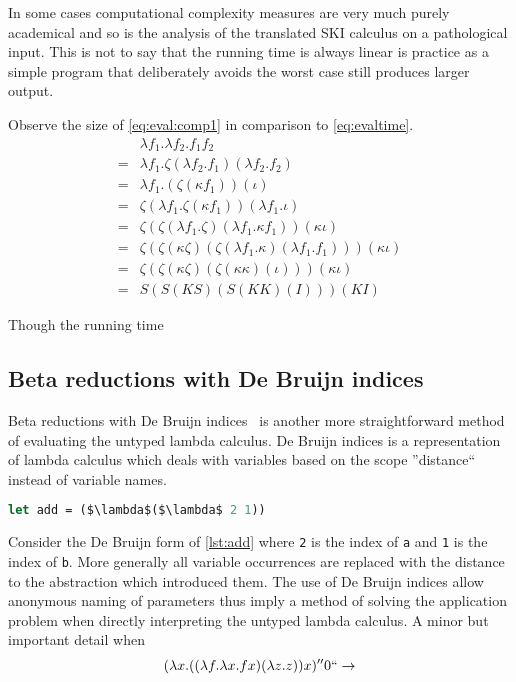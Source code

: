 \documentclass[11pt,oneside,a4paper]{report}
\begin{document}
In some cases computational complexity measures are very much purely academical and so is the analysis of the translated SKI calculus on a pathological input.
This is not to say that the running time is always linear is practice as a simple program that deliberately avoids the worst case still produces larger output.
\begin{exmp}
    Observe the size of \autoref{eq:eval:comp1} in comparison to \autoref{eq:evaltime}.
\begin{align}
    &\lambda f_1 . \lambda f_2 . f_1 f_2 \label{eq:eval:comp1}\\
    =&\lambda f_1 . \zeta(\lambda f_2 . f_1)(\lambda f_2 . f_2) \tag*{} \\
    =&\lambda f_1 . (\zeta(\kappa f_1))(\iota) \tag*{} \\
    =&\zeta (\lambda f_1 . \zeta (\kappa f_1)) (\lambda f_1 . \iota) \tag*{} \\
    =&\zeta (\zeta (\lambda f_1 . \zeta) (\lambda f_1 . \kappa f_1)) (\kappa \iota) \tag*{} \\
    =&\zeta (\zeta (\kappa \zeta) (\zeta (\lambda f_1 . \kappa) (\lambda f_1 . f_1))) (\kappa \iota) \tag*{} \\
    =&\zeta (\zeta (\kappa \zeta) (\zeta (\kappa \kappa) (\iota))) (\kappa \iota) \tag*{} \\
    =&S (S (K S) (S (K K) (I))) (K I) \tag*{}
\end{align}
\end{exmp}

Though the running time 

\subsection{Beta reductions with De Bruijn indices}
Beta reductions with De Bruijn indices~\cite{de1972lambda} is another more straightforward method of evaluating the untyped lambda calculus.
De Bruijn indices is a representation of lambda calculus which deals with variables based on the scope ''distance`` instead of variable names.
\begin{lstlisting}[language=ML,caption={Add as De Bruijn},label={lst:adddebru},mathescape=true]
let add = ($\lambda$($\lambda$ 2 1))
\end{lstlisting}
Consider the De Bruijn form of \autoref{lst:add} where \texttt{2} is the index of \texttt{a} and \texttt{1} is the index of \texttt{b}.
More generally all variable occurrences are replaced with the distance to the abstraction which introduced them.
The use of De Bruijn indices allow anonymous naming of parameters thus imply a method of solving the application problem when directly interpreting the untyped lambda calculus.
A minor but important detail when 
\begin{align}
    &(\lambda x . ((\lambda f. \lambda x. f x)(\lambda z . z))x)''0`` \rightarrow\\
    &
\end{align}
\end{document}
